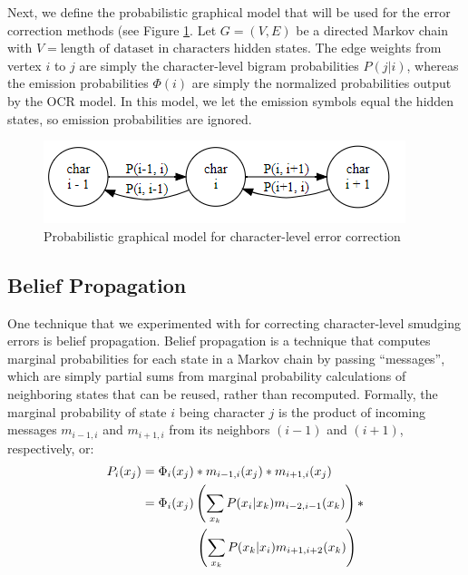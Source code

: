 \documentclass[10pt,twocolumn,letterpaper]{article}
\begin{document}
Next, we define the probabilistic graphical model that will be used
for the error correction methods (see Figure
\ref{fig:probabilistic_graphical_model}. Let $G = (V, E)$ be a directed
Markov chain with $V = \text{length of dataset in characters}$ hidden
states. The edge weights from vertex $i$ to $j$ are simply the
character-level bigram probabilities $P(j | i)$, whereas the emission
probabilities $\Phi(i)$ are simply the normalized probabilities output
by the OCR model. In this model, we let the emission symbols equal the
hidden states, so emission probabilities are ignored.

\begin{figure}
\includegraphics[scale=.8]{Capture.PNG}
\caption{\label{fig:probabilistic_graphical_model} Probabilistic graphical model for character-level error correction}
\end{figure}

\subsection{Belief Propagation}

One technique that we experimented with for correcting character-level
smudging errors is belief propagation. Belief propagation is a technique
that computes marginal probabilities for each state in a Markov chain
by passing ``messages'', which are simply partial sums from marginal
probability calculations of neighboring states that can be reused,
rather than recomputed. Formally, the marginal probability
of state $i$ being character $j$ is the product of incoming messages
$m_{i-1, i}$ and $m_{i + 1, i}$ from its neighbors $(i - 1)$ and
$(i + 1)$, respectively, or:
\begin{equation}
\begin{split}
P_i(x_j) &= \Phi_i(x_j) * m_{i - 1, i}(x_j) * m_{i + 1, i}(x_j) \\
&= \Phi_i(x_j) \left(\sum_{x_k} P(x_i | x_k) m_{i - 2, i - 1}(x_k) \right) *\\
&\hspace{15mm} \left(\sum_{x_k} P(x_k | x_i) m_{i + 1, i + 2}(x_k) \right) \\ 
\end{split}
\end{equation}
\end{document}
